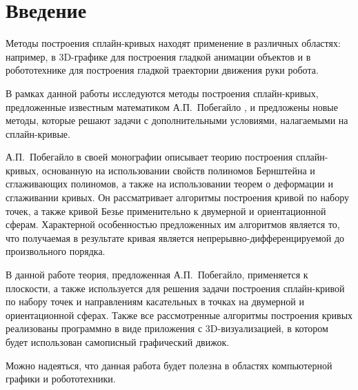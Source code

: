 \chapter*{Введение}

Методы построения сплайн-кривых находят применение в различных областях: например, в 3D-графике для построения гладкой
анимации объектов и в робототехнике для построения гладкой траектории движения руки робота.

В рамках данной работы исследуются методы построения сплайн-кривых, предложенные известным математиком
А.П.~Побегайло \cite{pobegaylo}, и предложены новые методы, которые решают задачи с дополнительными условиями,
налагаемыми на сплайн-кривые.

А.П.~Побегайло в своей монографии описывает теорию построения сплайн-кривых, основанную на
использовании свойств полиномов Бернштейна и сглаживающих полиномов, а также на использовании теорем о деформации и
сглаживании кривых. Он рассматривает алгоритмы построения кривой по набору точек, а также кривой Безье применительно
к двумерной и ориентационной сферам. Характерной особенностью предложенных им алгоритмов является то, что получаемая
в результате кривая является непрерывно-дифференцируемой до произвольного порядка.

В данной работе теория, предложенная А.П.~Побегайло, применяется к плоскости, а также используется для
решения задачи построения сплайн-кривой по набору точек и направлениям касательных в точках на двумерной и
ориентационной сферах. Также все рассмотренные алгоритмы построения кривых реализованы программно в виде
приложения с 3D-визуализацией, в котором будет использован самописный графический движок.

Можно надеяться, что данная работа будет полезна в областях компьютерной графики и робототехники.
